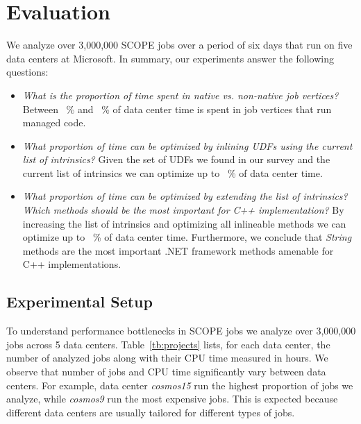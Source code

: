 \section{Evaluation}
\label{sec:evaluation}

We analyze over 3,000,000 SCOPE jobs over a period of six days that run on five data centers at Microsoft. 
In summary, our experiments answer the following questions:

\begin{itemize}
\item \emph{What is the proportion of time spent in native vs. non-native job vertices?}
Between \nonNativeTimeL{}~\% and \nonNativeTimeU~\% of data center time is spent in job vertices that run managed code.

\item \emph{What proportion of time can be optimized by inlining UDFs using  the current list of intrinsics?} 
Given the set of UDFs we found in our survey and  the current list of intrinsics we can optimize up to \optimizableU{}~\% of data center time.

\item \emph{What proportion of time can be optimized by extending the list of intrinsics? 
Which methods should be the most important for C++ implementation?}
By increasing the list of intrinsics and optimizing all inlineable methods we can optimize up to \potentiallyOptimizableU{}~\% of data center time. 
Furthermore, we conclude that \emph{String} methods are the most important .NET framework methods amenable for C++ implementations.


\end{itemize}

\subsection{Experimental Setup}
To understand performance bottlenecks in SCOPE jobs we analyze over 3,000,000 jobs across 5 data centers.
Table~\ref{tb:projects} lists, for each data center, the number of analyzed jobs along with their CPU time measured in hours.
We observe that number of jobs and CPU time significantly vary between data centers. 
For example, data center \emph{cosmos15} run the highest proportion of jobs we analyze, while \emph{cosmos9} run the most expensive jobs. 
This is expected because different data centers are usually tailored for different types of jobs. 


